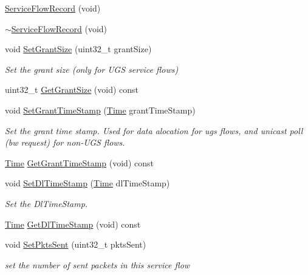 \begin{DoxyCompactItemize}
\item 
\hyperlink{classns3_1_1ServiceFlowRecord_afff4ede264b8f71749261a4d3d7306f8}{Service\+Flow\+Record} (void)
\item 
\hyperlink{classns3_1_1ServiceFlowRecord_aa8c19c6b84fc5563a12e951cc469e234}{$\sim$\+Service\+Flow\+Record} (void)
\item 
void \hyperlink{classns3_1_1ServiceFlowRecord_a8799abe7b3b32cdfd1cef4381036f895}{Set\+Grant\+Size} (uint32\+\_\+t grant\+Size)
\begin{DoxyCompactList}\small\item\em Set the grant size (only for U\+GS service flows) \end{DoxyCompactList}\item 
uint32\+\_\+t \hyperlink{classns3_1_1ServiceFlowRecord_aba63ec34d43927996f0a3a73a5683de9}{Get\+Grant\+Size} (void) const 
\item 
void \hyperlink{classns3_1_1ServiceFlowRecord_ad6e59e42ef11306b0fbc5d6fec4cf5b5}{Set\+Grant\+Time\+Stamp} (\hyperlink{classns3_1_1Time}{Time} grant\+Time\+Stamp)
\begin{DoxyCompactList}\small\item\em Set the grant time stamp. Used for data alocation for ugs flows, and unicast poll (bw request) for non-\/\+U\+GS flows. \end{DoxyCompactList}\item 
\hyperlink{classns3_1_1Time}{Time} \hyperlink{classns3_1_1ServiceFlowRecord_a0649070d5fa6ca1b24edf3667f057954}{Get\+Grant\+Time\+Stamp} (void) const 
\item 
void \hyperlink{classns3_1_1ServiceFlowRecord_a6bc793745737f2bb01ace452402350ff}{Set\+Dl\+Time\+Stamp} (\hyperlink{classns3_1_1Time}{Time} dl\+Time\+Stamp)
\begin{DoxyCompactList}\small\item\em Set the Dl\+Time\+Stamp. \end{DoxyCompactList}\item 
\hyperlink{classns3_1_1Time}{Time} \hyperlink{classns3_1_1ServiceFlowRecord_ae94a79272260749a293ec8167684f58d}{Get\+Dl\+Time\+Stamp} (void) const 
\item 
void \hyperlink{classns3_1_1ServiceFlowRecord_a78296b9b97f7f56715f26d486c865edc}{Set\+Pkts\+Sent} (uint32\+\_\+t pkts\+Sent)
\begin{DoxyCompactList}\small\item\em set the number of sent packets in this service flow \end{DoxyCompactList}\item 

\end{DoxyCompactItemize}
